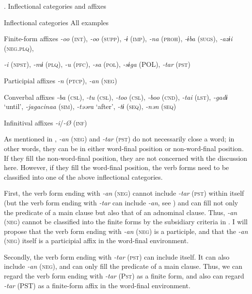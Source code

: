 \begin{table}
\caption{\label{tab:key:79}. Inflectional categories and affixes}

Inflectional categories  All examples

Finite-form affixes  \textit{-oo} (\textsc{int}), \textit{-oo} (\textsc{supp}), \textit{-ɨ} (\textsc{imp}), \textit{-na} (\textsc{proh}), \textit{-ɨba} (\textsc{sugs}), \textit{-azɨi} (\textsc{neg}.\textsc{plq}),

\textit{-i} (\textsc{npst}), \textit{-mɨ} (\textsc{plq}), \textit{-u} (\textsc{pfc}), \textit{-sa} (\textsc{pol}), \textit{-sɨga} (POL), \textit{-tar} (\textsc{pst})

Participial affixes  \textit{-n} (\textsc{ptcp}), \textit{-an} (\textsc{neg})

Converbal affixes  \textit{-ba} (\textsc{csl}), \textit{-tu} (\textsc{csl}), \textit{-too} (\textsc{csl}), \textit{-boo} (\textsc{cnd}), \textit{-tai} (\textsc{lst}), \textit{-gadɨ} ‘until’, \textit{-jagacinaa} (\textsc{sim}), \textit{-təəra} ‘after’, \textit{-tɨ} (\textsc{seq}), \textit{-nən} (\textsc{seq})

Infinitival affixes  \textit{-i}/\textit{-Ø} (\textsc{inf})
\end{table}

As mentioned in , \textit{-an} (\textsc{neg}) and \textit{-tar} (\textsc{pst}) do not necessarily close a word; in other words, they can be in either word-final position or non-word-final position. If they fill the non-word-final position, they are not concerned with the discussion here. However, if they fill the word-final position, the verb forms need to be classified into one of the above inflectional categories.

First, the verb form ending with \textit{-an} (\textsc{neg}) cannot include \textit{-tar} (\textsc{pst}) within itself (but the verb form ending with \textit{-tar} can include \textit{-an}, see ) and can fill not only the predicate of a main clause but also that of an adnominal clause. Thus, \textit{-an} (\textsc{neg}) cannot be classified into the finite forms by the subsidiary criteria in . I will propose that the verb form ending with \textit{-an} (\textsc{neg}) is a participle, and that the \textit{-an} (\textsc{neg}) itself is a participial affix in the word-final environment.

Secondly, the verb form ending with \textit{-tar} (\textsc{pst}) can include itself. It can also include \textit{-an} (\textsc{neg}), and can only fill the predicate of a main clause. Thus, we can regard the verb form ending with \textit{-tar} (P\textsc{st}) as a finite form, and also can regard \textit{-tar} (PST) as a finite-form affix in the word-final environment.

